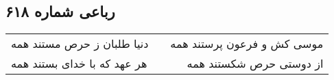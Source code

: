 \begin{center}
\section*{رباعی شماره ۶۱۸}
\label{sec:sh618}
\begin{longtable}{l p{0.5cm} r}
دنیا طلبان ز حرص مستند همه
&&
موسی کش و فرعون پرستند همه
\\
هر عهد که با خدای بستند همه
&&
از دوستی حرص شکستند همه
\\
\end{longtable}
\end{center}
